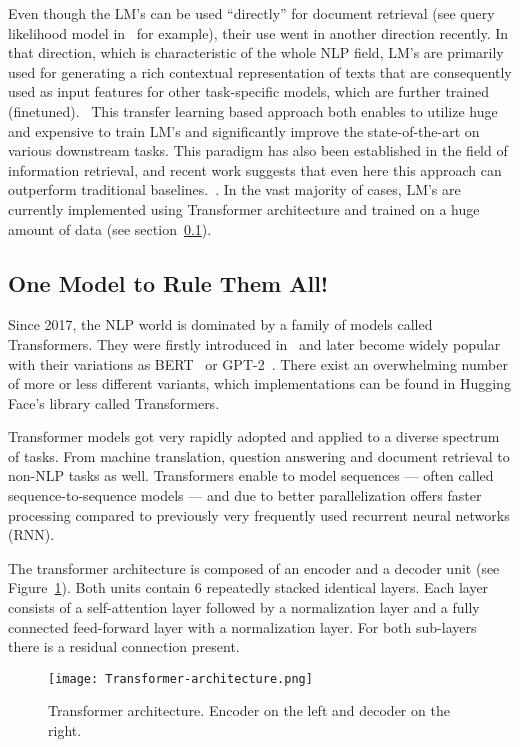     Even though the LM's can be used \enquote{directly} for document retrieval (see query likelihood model in~\parencite{manning2008introduction} for example), their use went in another direction recently. In that direction, which is characteristic of the whole NLP field, LM's are primarily used for generating a rich contextual representation of texts that are consequently used as input features for other task-specific models, which are further trained (finetuned).~\parencite{ruder2021lmfine-tuning} This transfer learning based approach both enables to utilize huge and expensive to train LM's and significantly improve the state-of-the-art on various downstream tasks. This paradigm has also been established in the field of information retrieval, and recent work suggests that even here this approach can outperform traditional baselines.~\parencite{trec2020overview,Lee_2019_ict,Karpukhin_2020}.
    In the vast majority of cases, LM's are currently implemented using Transformer architecture and trained on a huge amount of data (see section~\ref{section:transformers}).


\subsection{One Model to Rule Them All!}
\label{section:transformers}
    Since 2017, the NLP world is dominated by a family of models called Transformers. They were firstly introduced in~\parencite{vaswani2017attention} and later become widely popular with their variations as BERT~\parencite{devlin2018bert} or GPT-2~\parencite{radford2019language}. There exist an overwhelming number of more or less different variants, which implementations can be found in Hugging Face's library called Transformers.~\parencite{wolf-etal-2020-transformers} 
    
    Transformer models got very rapidly adopted and applied to a diverse spectrum of tasks. From machine translation, question answering and document retrieval to non-NLP tasks as well. Transformers enable to model sequences --- often called sequence-to-sequence models --- and due to better parallelization offers faster processing compared to previously very frequently used recurrent neural networks (RNN).
    
    The transformer architecture is composed of an encoder and a decoder unit (see Figure~\ref{fig:transformer-arch}). Both units contain 6 repeatedly stacked identical layers. Each layer consists of a self-attention layer followed by a normalization layer and a fully connected feed-forward layer with a normalization layer. For both sub-layers there is a residual connection present.
    \begin{figure}[H]
        \texttt{[image: Transformer-architecture.png]}
        \centering
        \caption[Transformer architecture]{Transformer architecture. Encoder on the left and decoder on the right.~\parencite{vaswani2017attention}}
        \label{fig:transformer-arch}
    \end{figure}
    
